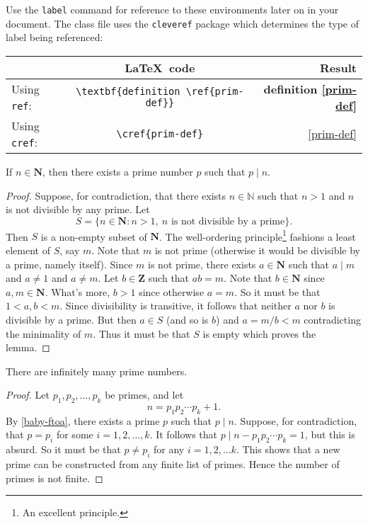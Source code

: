 \documentclass{rhumj_new}
\begin{document}
Use the \texttt{label} command for reference to these environments later on in your document. The class file uses the \texttt{cleveref} package which determines the type of label being referenced:
\begin{center}
\begin{tabular}{lcr}
 & \LaTeX\ code & Result \\
 \hline
Using \texttt{ref}: & \verb|\textbf{definition \ref{prim-def}}| & \textbf{definition \ref{prim-def}} \\
Using \texttt{cref}: & \verb|\cref{prim-def}| & \cref{prim-def}
\end{tabular}
\end{center}

\begin{lemma} \label{baby-ftoa}
If $n \in \mathbf{N}$, then there exists a prime number $p$ such that $p \mid n$.
\end{lemma}

\begin{proof}
Suppose, for contradiction, that there exists $n \in \mathbb{N}$ such that $n >1$ and $n$ is not divisible by any prime. Let
\[ S = \{ n \in \mathbf{N}: n>1,\ \text{$n$ is not divisible by a prime}\}.\]
Then $S$ is a non-empty subset of $\mathbf{N}$. The well-ordering principle\footnote{An excellent principle.} fashions a least element of $S$, say $m$. Note that $m$ is not prime (otherwise it would be divisible by a prime, namely itself). Since $m$ is not prime, there exists $a \in \mathbf{N}$ such that $a \mid m$ and $a \neq 1$ and $a \neq m$. Let $b \in \mathbf{Z}$ such that $ab = m$. Note that $b \in \mathbf{N}$ since $a,m \in \mathbf{N}$. What's more, $b >1$ since otherwise $a=m$. So it must be that $1 < a,b < m$. Since divisibility is transitive, it follows that neither $a$ nor $b$ is divisible by a prime. But then $a \in S$ (and so is $b$) and $a  = m/b < m$ contradicting the minimality of $m$. Thus it must be that $S$ is empty which proves the lemma.
\end{proof}

\begin{thm}[Euclid] There are infinitely many prime numbers.
\end{thm} \label{inf-prim}

\begin{proof}
Let $p_1,p_2,\ldots, p_k$ be primes, and let 
\[ n = p_1p_2 \cdots p_k + 1.\]
By \cref{baby-ftoa}, there exists a prime $p$ such that $p \mid n$. Suppose, for contradiction, that $p = p_i$ for some $i=1,2,\ldots, k$. It follows that $p \mid n-p_1p_2\cdots p_k = 1$, but this is absurd. So it must be that $p \neq p_i$ for any $i = 1,2,\ldots k$. This shows that a new prime can be constructed from any finite list of primes. Hence the number of primes is not finite. 
\end{proof}
\end{document}
